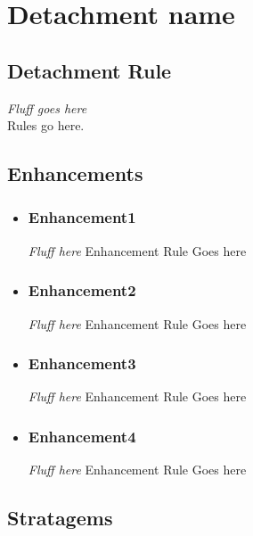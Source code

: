 \documentclass{report}
\begin{document}
\chapter{Detachment name}

\begin{multicols}{2}

\begin{minipage}[t][7cm][b]{\textwidth}
\section{Detachment Rule}\label{sec:rule}%
\textit{Fluff goes here}\\
Rules go here.\\
\section{Enhancements}
\begin{itemize}
\item \subsection{Enhancement1}
\textit{Fluff here}
Enhancement Rule Goes here
\item \subsection{Enhancement2}
\textit{Fluff here}
Enhancement Rule Goes here
\item \subsection{Enhancement3}
\textit{Fluff here}
Enhancement Rule Goes here
\item \subsection{Enhancement4}
\textit{Fluff here}
Enhancement Rule Goes here
\end{itemize}
\end{minipage}
\begin{minipage}[t][7cm][b]{\textwidth}
\section{Stratagems}\label{sec:strats}
\end{minipage}
\end{multicols}
\end{document}
